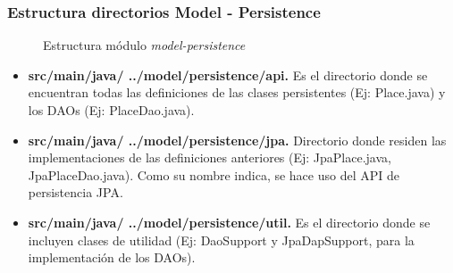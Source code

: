 \subsubsection*{Estructura directorios Model - Persistence}
\begin{figure}[H]
\centering
{}
\caption{Estructura módulo \textit{model-persistence}}
\end{figure}

\begin{itemize}
	\item \textbf{src/main/java/ ../model/persistence/api. }Es el directorio donde se encuentran todas las definiciones de las clases persistentes (Ej: Place.java) y los DAOs (Ej: PlaceDao.java).
	\item \textbf{src/main/java/ ../model/persistence/jpa. }Directorio donde residen las implementaciones de las definiciones anteriores (Ej: JpaPlace.java, JpaPlaceDao.java). Como su nombre indica, se hace uso del API de persistencia JPA. 
	\item \textbf{src/main/java/ ../model/persistence/util. }Es el directorio donde se incluyen clases de utilidad (Ej: DaoSupport y JpaDapSupport, para la implementación de los DAOs).
\end{itemize}

